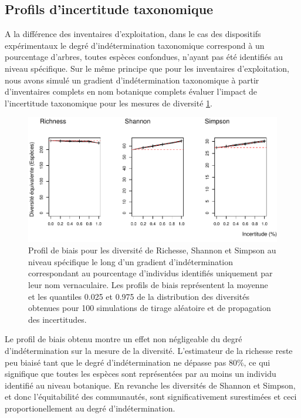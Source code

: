 \documentclass[
  11pt,
  french,
  A4paper,
  extrafontsizes,onecolumn,openright
  ]{memoir}
\begin{document}
\subsection{Profils d'incertitude
taxonomique}\label{profils-dincertitude-taxonomique}

A la différence des inventaires d'exploitation, dans le cas des
dispositifs expérimentaux le degré d'indétermination taxonomique
correspond à un pourcentage d'arbres, toutes espèces confondues, n'ayant
pas été identifiés au niveau spécifique. Sur le même principe que pour
les inventaires d'exploitation, nous avons simulé un gradient
d'indétermination taxonomique à partir d'inventaires complets en nom
botanique complets évaluer l'impact de l'incertitude taxonomique pour
les mesures de diversité \ref{fig:FigTreesSp}.

\begin{figure}

{\centering \includegraphics[width=1\linewidth]{MyBook_files/figure-latex/FigTreesSp-1} 

}

\caption{Profil de biais pour les diversité de Richesse, Shannon et Simpson au niveau spécifique le long d'un gradient d'indétermination correspondant au pourcentage d'individus identifiés uniquement par leur nom vernaculaire. Les profils de biais représentent la moyenne et les quantiles 0.025 et 0.975 de la distribution des diversités obtenues pour 100 simulations de tirage aléatoire et de propagation des incertitudes.}\label{fig:FigTreesSp}
\end{figure}

Le profil de biais obtenu montre un effet non négligeable du degré
d'indétermination sur la mesure de la diversité. L'estimateur de la
richesse reste peu biaisé tant que le degré d'indétermination ne dépasse
pas 80\%, ce qui signifique que toutes les espèces sont représentées par
au moins un individu identifié au niveau botanique. En revanche les
diversités de Shannon et Simpson, et donc l'équitabilité des
communautés, sont significativement surestimées et ceci
proportionellement au degré d'indétermination.
\end{document}

